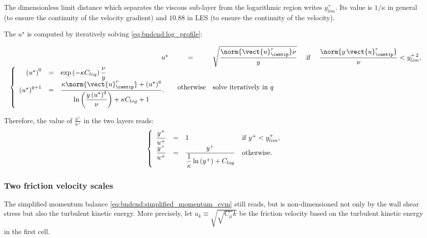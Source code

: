 The dimensionless limit distance which separates the viscous sub-layer from the logarithmic region writes $y^+_{lim}$. Its value is $1/ \kappa$ in general (to ensure the continuity of the velocity gradient) and $10.88$ in LES (to ensure the continuity of the velocity).  

The $u^\star$ is computed by  iteratively solving \eqref{eq:bndcnd:log_profile}:

\begin{equation}
\begin{array}{r c l c l}
u^\star &=& \sqrt{ \dfrac{\norm{ \vect{u}^r_{\centip} } \nu }{ y } } & \textrm{ if } & \dfrac{\norm{ y \, \vect{u}^r_{\centip} }}{\nu} < y^{+\, 2}_{lim}, \\
%
\left\lbrace
\begin{array}{r c l}
\left( u^\star \right)^{0} &=& \exp \left( - \kappa C_{log}\right) \dfrac{\nu}{y} \\
 \left( u^\star \right)^{q+1} &=& \dfrac{ \kappa \norm{ \vect{u}^r_{\centip} } + \left( u^\star \right) ^{q} }{ \ln \left( \dfrac{y \left( u^\star \right) ^{q} }{ \nu} \right) + \kappa C_{log} +1 }.
\end{array}
\right.
& \textrm{ otherwise}& \textrm{solve iteratively in $q$}
\end{array}
\end{equation}

Therefore, the value of $\frac{y^+}{u^+}$ in the two layers reads:
\begin{equation}\label{eq:bndcnd:ypup_1scale}
\left\lbrace
\begin{array}{r c l l}
\dfrac{y^+}{u^+} &=& 1 & \textrm{if } y^+ < y^+_{lim}, \\
\dfrac{y^+}{u^+} &=& \dfrac{y^+}{ \dfrac{1}{\kappa} \ln \left( y^+\right) + C_{log}} & \textrm{otherwise}.
\end{array}
\right.
\end{equation}  

\subsubsection{Two friction velocity scales}\label{sec:bndcnd:2velocityscales}

The simplified momentum balance \eqref{eq:bndcnd:simplified_momentum_evm} still reads, but is non-dimensioned not only
by the wall shear stress but also the turbulent kinetic energy. More precisely, let $u_k \equiv \sqrt{\sqrt{C_\mu} k }$ be the friction velocity based on 
the turbulent kinetic energy in the first cell.

